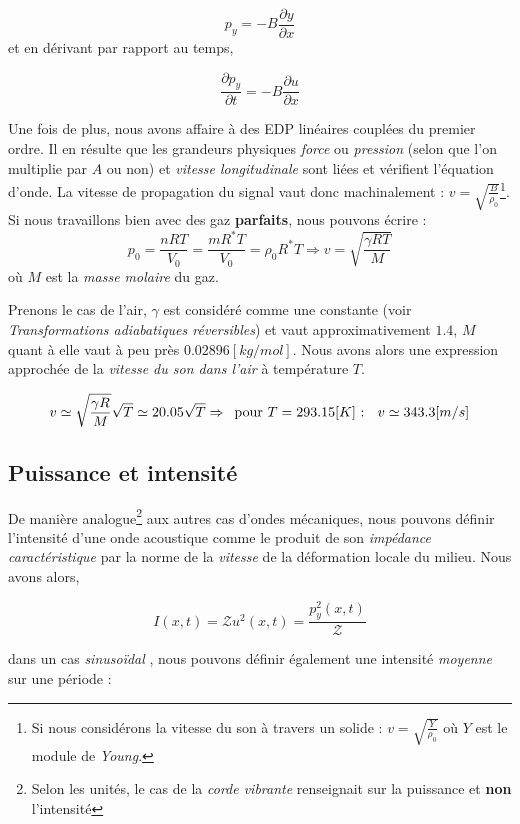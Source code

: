 \[p_{y}  = - B \frac{\partial y}{\partial x}\] et en dérivant par rapport au temps,

\[\frac{\partial p_{y}}{\partial t} =  - B \frac{\partial u}{\partial x}\]


Une fois de plus, nous avons affaire à des EDP linéaires couplées du premier ordre. Il en résulte que les grandeurs physiques \textit{force} ou \textit{pression} (selon que l'on multiplie par $A$ ou non) et 
\textit{vitesse longitudinale} sont liées et vérifient l'équation d'onde. La vitesse de propagation du signal vaut donc machinalement : $v = \sqrt{\frac{B}{\rho_{0}}}$\footnote{Si nous considérons la vitesse du son à travers un solide : $v = \sqrt{\frac{Y}{\rho_{0}}}$ où $Y$ est le module de \textit{Young}.}.  Si nous travaillons bien avec des
gaz \textbf{parfaits}, nous pouvons écrire : $$p_{0} = \frac{nRT}{V_{0}}= \frac{mR^{*}T}{V_{0}} = \rho_{0}R^{*}T \Rightarrow v = \sqrt{\frac{\gamma RT}{M}}$$ où $M$ est la \textit{masse molaire} du gaz.

Prenons le cas de l'air, $\gamma$ est considéré comme une constante (voir \textit{Transformations adiabatiques réversibles}) et vaut approximativement $1.4$, $M$ quant à elle
vaut à peu près $0.02896 [kg/mol]$. Nous avons alors une expression approchée de la \textit{vitesse du son dans l'air} à température $T$. 

\[ v \simeq \sqrt{\frac{\gamma R}{M}} \sqrt{T} \simeq 20.05 \sqrt{T} \Rightarrow \hspace{5 pt} \mbox{pour $T = 293.15[K]$ : } \hspace{5pt} v \simeq 343.3 [m/s]\]

\subsection{Puissance et intensité}

De manière analogue\footnote{Selon les unités, le cas de la \textit{corde vibrante} renseignait sur la puissance et \textbf{non} l'intensité} aux autres cas d'ondes mécaniques, nous pouvons définir l'intensité d'une onde acoustique comme le produit de son \textit{impédance caractéristique}
par la norme de la \textit{vitesse} de la déformation locale du milieu.
Nous avons alors, 

\[I(x,t) = \mathcal{Z} u^{2}(x,t) = \frac{p_{y}^{2}(x,t)}{\mathcal{Z}}\]

dans un cas \textit{sinusoïdal}%
, nous pouvons définir également une intensité \textit{moyenne} sur une période : 

